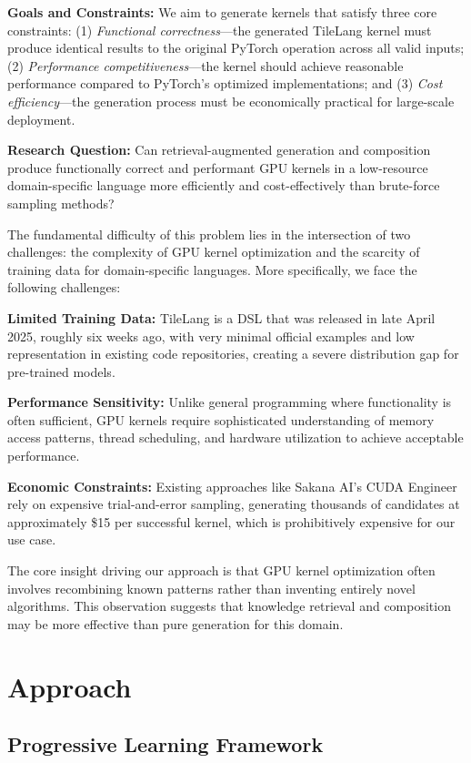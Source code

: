 \documentclass{article}
\begin{document}
\textbf{Goals and Constraints:} We aim to generate kernels that satisfy three core constraints: (1) \textit{Functional correctness}—the generated TileLang kernel must produce identical results to the original PyTorch operation across all valid inputs; (2) \textit{Performance competitiveness}—the kernel should achieve reasonable performance compared to PyTorch's optimized implementations; and (3) \textit{Cost efficiency}—the generation process must be economically practical for large-scale deployment.

\textbf{Research Question:} Can retrieval-augmented generation and composition produce functionally correct and performant GPU kernels in a low-resource domain-specific language more efficiently and cost-effectively than brute-force sampling methods?

The fundamental difficulty of this problem lies in the intersection of two challenges: the complexity of GPU kernel optimization and the scarcity of training data for domain-specific languages. More specifically, we face the following challenges:

\textbf{Limited Training Data:} TileLang is a DSL that was released in late April 2025, roughly six weeks ago, with very minimal official examples and low representation in existing code repositories, creating a severe distribution gap for pre-trained models.

\textbf{Performance Sensitivity:} Unlike general programming where functionality is often sufficient, GPU kernels require sophisticated understanding of memory access patterns, thread scheduling, and hardware utilization to achieve acceptable performance.

\textbf{Economic Constraints:} Existing approaches like Sakana AI's CUDA Engineer \cite{sakana2024} rely on expensive trial-and-error sampling, generating thousands of candidates at approximately \$15 per successful kernel, which is prohibitively expensive for our use case.

The core insight driving our approach is that GPU kernel optimization often involves recombining known patterns rather than inventing entirely novel algorithms. This observation suggests that knowledge retrieval and composition may be more effective than pure generation for this domain.

\section{Approach}

\subsection{Progressive Learning Framework}
\end{document}
